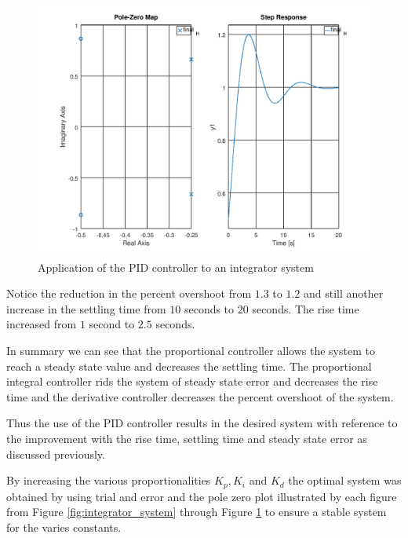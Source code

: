 \documentclass[a4paper, 12pt]{article}
\begin{document}
\begin{figure}[H]
	\centering
	\includegraphics[width=\textwidth]{integrator_system_proportional_integral_derivative_controller.png}
	\caption{Application of the PID controller to an integrator system}
	\label{fig:integrator_system_proportional_integral_derivative_controller}
\end{figure}

Notice the reduction in the percent overshoot from $1.3$ to $1.2$ and still another increase in the settling time from $10$ seconds to $20$ seconds. The rise time increased from $1$ second to $2.5$ seconds.

In summary we can see that the proportional controller allows the system to reach a steady state value and decreases the settling time. The proportional integral controller rids the system of steady state error and decreases the rise time and the derivative controller decreases the percent overshoot of the system.

Thus the use of the PID controller results in the desired system with reference to the improvement with the rise time, settling time and steady state error as discussed previously.

By increasing the various proportionalities $K_p, K_i$ and $K_d$ the optimal system was obtained by using trial and error and the pole zero plot illustrated by each figure from Figure \ref{fig:integrator_system} through Figure \ref{fig:integrator_system_proportional_integral_derivative_controller} to ensure a stable system for the varies constants.




\end{document}
